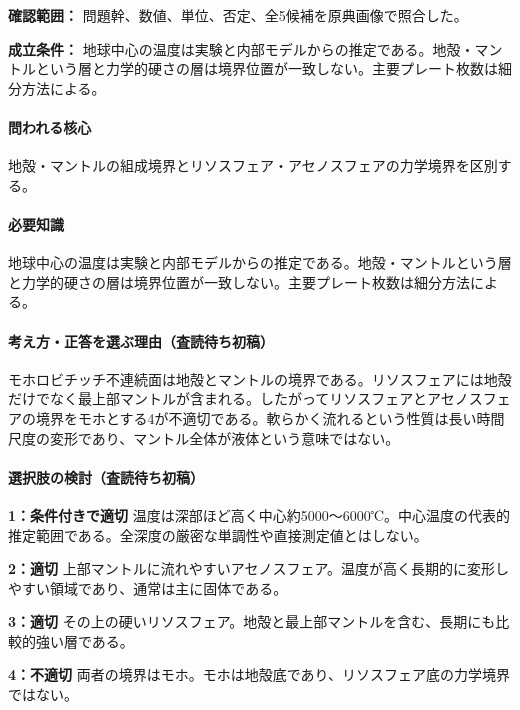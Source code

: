 \noindent\textbf{確認範囲：} 問題幹、数値、単位、否定、全5候補を原典画像で照合した。\par

\noindent\textbf{成立条件：} 地球中心の温度は実験と内部モデルからの推定である。地殻・マントルという層と力学的硬さの層は境界位置が一致しない。主要プレート枚数は細分方法による。\par

\paragraph{問われる核心} 地殻・マントルの組成境界とリソスフェア・アセノスフェアの力学境界を区別する。

\paragraph{必要知識} 地球中心の温度は実験と内部モデルからの推定である。地殻・マントルという層と力学的硬さの層は境界位置が一致しない。主要プレート枚数は細分方法による。

\paragraph{考え方・正答を選ぶ理由（査読待ち初稿）} モホロビチッチ不連続面は地殻とマントルの境界である。リソスフェアには地殻だけでなく最上部マントルが含まれる。したがってリソスフェアとアセノスフェアの境界をモホとする4が不適切である。軟らかく流れるという性質は長い時間尺度の変形であり、マントル全体が液体という意味ではない。

\paragraph{選択肢の検討（査読待ち初稿）}\mbox{}\par

\noindent\textbf{1：条件付きで適切} 温度は深部ほど高く中心約5000〜6000℃。中心温度の代表的推定範囲である。全深度の厳密な単調性や直接測定値とはしない。\par

\noindent\textbf{2：適切} 上部マントルに流れやすいアセノスフェア。温度が高く長期的に変形しやすい領域であり、通常は主に固体である。\par

\noindent\textbf{3：適切} その上の硬いリソスフェア。地殻と最上部マントルを含む、長期にも比較的強い層である。\par

\noindent\textbf{4：不適切} 両者の境界はモホ。モホは地殻底であり、リソスフェア底の力学境界ではない。\par

